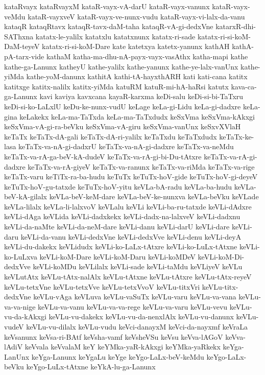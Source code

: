 {kataRvayx
kataRvayxM
kataR-vayx-vA-darU
kataR-vayx-vanunx
kataR-vayx-veMdu
kataR-vayxveV
kataR-vayx-ve-nunx-vudu
kataR-vayx-vi-lalx-da-vanu
kataqR
kataqRtavx
kataqR-tavx-daM-taha
kataqR-vA-gi-dedxVne
katarxR-dhi-SAThxna
katatx-le-yalilx
katatxlu
katatxnunx
katatx-ri-sade
katatx-ri-si-koM-DaM-teyeV
katatx-ri-si-koM-Dare
kate
katetxya
katetx-yanunx
kathAH
kathA-pA-tarx-vide
kathaM
katha-ma-dhu-nA-payx-vayx-vasAthx
katha-mapi
kathe
kathe-ga-Lanunx
katheyU
kathe-yalilx
kathe-yanunx
kathe-ye-lalx-vanUnx
kathe-yiMda
kathe-yoM-danunx
kathitA
kathi-tA-hayxthARH
kati
kati-cana
katitx
katitxge
katitx-nalilx
katitx-yiMda
katuRM
katuR-mi-hA-haRsi
katutx
kava-ca-ga-Lanunx
kavi
kaviya
kavxcana
kayaR-karxma
keDi-salu
keDi-si-bi-TaTxru
keDi-si-ko-LaLxlU
keDu-ke-nunx-vudU
keLage
keLa-gi-Lidu
keLa-gi-dadxre
keLa-gina
keLakekx
keLa-ma-TaTxda
keLa-ma-TaTxdudx
keSxVma
keSxVma-kAkxgi
keSxVma-vA-gi-ra-beVku
keSxVma-vA-giru
keSxVma-vanUnx
keSxvXVlaH
keTaTx
keTaTx-dA-gali
keTaTx-dA-ri-yalilx
keTaTxdu
keTaTxdudx
keTaTx-ke-lasa
keTaTx-va-nA-gi-dadxrU
keTaTx-va-nA-gi-dadxre
keTaTx-va-neMdu
keTaTx-va-rA-ga-beV-kA-dudeV
keTaTx-va-rA-gi-bi-Du-tAtxre
keTaTx-va-rA-gi-dadxre
keTaTx-va-rA-giyeV
keTaTx-va-ranunx
keTaTx-va-riMda
keTaTx-va-rige
keTaTx-varu
keTiTx-ra-ba-hudu
keTuTx
keTuTx-hoV-gide
keTuTx-hoV-gi-deyeV
keTuTx-hoV-gu-tatxde
keTuTx-hoV-yitu
keVLa-bA-radu
keVLa-ba-hudu
keVLa-beV-kA-gilalx
keVLa-beV-keM-dare
keVLa-beV-ke-nunxva
keVLa-beVku
keVLade
keVLa-lilalx
keVLa-li-lalxvoV
keVLalu
keVLi
keVLi-ba-ru-tatxde
keVLi-dAdxre
keVLi-dAga
keVLida
keVLi-dadxkekx
keVLi-dadx-na-lalxveV
keVLi-dadxnu
keVLi-da-naMte
keVLi-da-neM-dare
keVLi-danu
keVLi-darU
keVLi-dare
keVLi-daru
keVLi-da-vanu
keVLi-dedxVne
keVLi-dedxVve
keVLi-denu
keVLi-deyA
keVLi-du-dakekx
keVLidudx
keVLi-ko-LaLx-tAtxre
keVLi-ko-LuLx-tAtxne
keVLi-ko-LuLxva
keVLi-koM-Dare
keVLi-koM-Daru
keVLi-koMDeV
keVLi-koM-Di-dedxVve
keVLi-koMDu
keVLilalx
keVLi-sade
keVLi-taMdu
keVLiyeV
keVLu
keVLutAtx
keVLu-tAtx-nalAlx
keVLu-tAtxne
keVLu-tAtxre
keVLu-tAtx-reyeV
keVLu-tetxVne
keVLu-tetxVve
keVLu-tetxVvoV
keVLu-titxVri
keVLu-titx-dedxVne
keVLu-vAga
keVLuva
keVLu-vaSuTx
keVLu-varu
keVLu-va-vana
keVLu-va-va-nige
keVLu-va-vanu
keVLu-va-va-rege
keVLu-va-varu
keVLu-vevu
keVLu-vu-da-kAkxgi
keVLu-vu-dakekx
keVLu-vu-da-nenxlAlx
keVLu-vu-danunx
keVLu-vudeV
keVLu-vu-dilalx
keVLu-vudu
keVci-danayxM
keVci-da-nayxmf
keVraLa
keVsanunx
keVsa-ri-BAtf
keVsha-vamf
keVsheVSu
keVsu
keVva-lAGoV
keVva-lAdiV
keVvala
keVvalaM
keY
keYMka-yaR-kAkxgi
keYMka-yaRkekx
keYga-LanUnx
keYga-Lanunx
keYgaLu
keYge
keYgo-LaLx-beV-keMdu
keYgo-LaLx-beVku
keYgo-LuLx-tAtxne
keYkA-lu-ga-Lanunx
}
